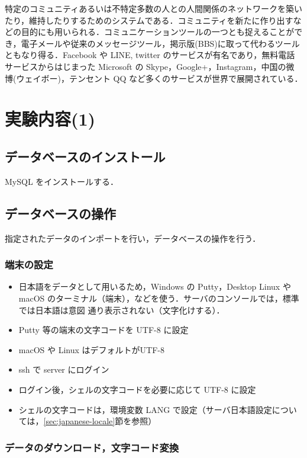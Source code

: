 特定のコミュニティあるいは不特定多数の人との人間関係のネットワークを築い
たり，維持したりするためのシステムである．コミュニティを新たに作り出すな
どの目的にも用いられる．コミュニケーションツールの一つとも捉えることがで
き，電子メールや従来のメッセージツール，掲示版(BBS)に取って代わるツール
ともなり得る．Facebook や LINE, twitter のサービスが有名であり，無料電話
サービスからはじまった Microsoft の Skype，Google+，Instagram，中国の微
博(ウェイボー)，テンセント QQ など多くのサービスが世界で展開されている．

\clearpage

\section{実験内容(1)}

\subsection*{データベースのインストール}

MySQL をインストールする．

\subsection*{データベースの操作}

指定されたデータのインポートを行い，データベースの操作を行う．

\subsubsection{端末の設定}
\begin{itemize}
 \item 日本語をデータとして用いるため，Windows の Putty，Desktop Linux や macOS のターミナル（端末），などを使う．サーバのコンソールでは，標準では日本語は意図
 通り表示されない（文字化けする）．
 \item Putty 等の端末の文字コードを UTF-8 に設定
 \item macOS や Linux はデフォルトがUTF-8
 \item ssh で server にログイン
 \item ログイン後，シェルの文字コードを必要に応じて UTF-8 に設定
 \item シェルの文字コードは，環境変数 LANG で設定（サーバ日本語設定については，\ref{sec:japanese-locale}節を参照）\end{itemize}



\subsubsection{データのダウンロード，文字コード変換}

